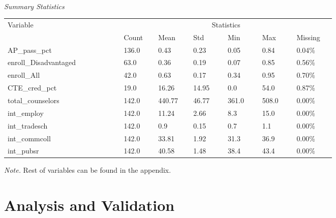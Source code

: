 \documentclass[10pt]{beamer}
\begin{document}
\begin{frame}
    \begin{threeparttable}
        \caption{\\\textit{Summary Statistics}}
        \begin{tabular}{ p{0.27\linewidth} p{0.08\linewidth} p{0.08\linewidth} p{0.08\linewidth} p{0.08\linewidth} p{0.08\linewidth} p{0.08\linewidth}}
            \toprule
            Variable & \multicolumn{6}{c}{Statistics} \\
            \cmidrule(r){2-7}
            &    Count   &   Mean & Std & Min & Max & Missing  \\ 
            \midrule
            AP\_pass\_pct &  136.0  &  0.43 & 0.23 & 0.05 & 0.84 & 0.04\%  \\ 
            enroll\_Disadvantaged &  63.0  &  0.36 & 0.19 & 0.07 & 0.85 & 0.56\%   \\
            enroll\_All &  42.0  &  0.63 & 0.17 & 0.34 & 0.95 & 0.70\%  \\
            CTE\_cred\_pct &  19.0  &  16.26 & 14.95 & 0.0 & 54.0 & 0.87\%  \\ 
            total\_counselors &  142.0  &  440.77 & 46.77 & 361.0 & 508.0 & 0.00\% \\
            int\_employ &  142.0  &  11.24 & 2.66 & 8.3 & 15.0 & 0.00\%  \\
            int\_tradesch &  142.0  &  0.9 & 0.15 & 0.7 & 1.1 & 0.00\%  \\ 
            int\_commcoll &  142.0  &  33.81 & 1.92 & 31.3 & 36.9 & 0.00\% \\
            int\_pubsr &  142.0  &  40.58 & 1.48 & 38.4 & 43.4 & 0.00\%  \\
            \midrule
        \end{tabular}
        \small \emph{Note.} Rest of variables can be found in the appendix.
        \end{threeparttable}
\end{frame}

\section{Analysis and Validation}
\end{document}
